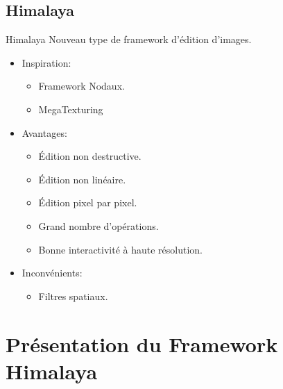 \documentclass[slidetop,compress,mathserif]{beamer}
\begin{document}
	\subsection{Himalaya}
	\begin{frame}{Himalaya}
		Nouveau type de framework d'édition d'images.
		\begin{itemize}
			\pause
			\item Inspiration:
			\begin{itemize}
				\item Framework Nodaux.
				\item MegaTexturing
			\end{itemize}
			\pause
			\item Avantages: 
			\begin{itemize}
				\item Édition non destructive.
				\item Édition non linéaire.
				\item Édition pixel par pixel.
				\item Grand nombre d'opérations.
				\item Bonne interactivité à haute résolution.
			\end{itemize}
			\pause
			\item Inconvénients: 
			\begin{itemize}
				\item Filtres spatiaux.
			\end{itemize}
		\end{itemize}
	\end{frame}
	\section{Présentation du Framework Himalaya}
\end{document}
